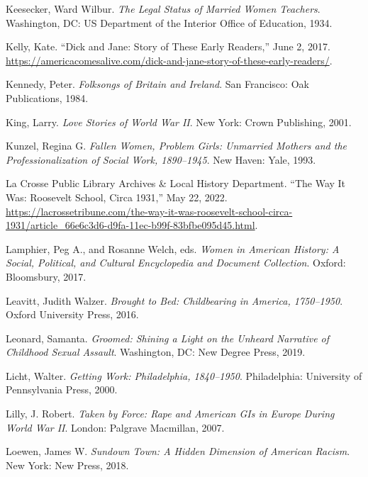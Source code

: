\documentclass[
  letterpaper,
]{book}
\newlength{\cslhangindent}
\newenvironment{CSLReferences}[2] %
 {\begin{list}{}{%
  \setlength{\itemindent}{0pt}
  \setlength{\leftmargin}{0pt}
  \setlength{\parsep}{0pt}
  \ifodd #1
   \setlength{\leftmargin}{\cslhangindent}
   \setlength{\itemindent}{-1\cslhangindent}
  \fi
  \setlength{\itemsep}{#2\baselineskip}}}
 {\end{list}}
\begin{document}
\begin{CSLReferences}{1}{0}
Keesecker, Ward Wilbur. \emph{The Legal Status of Married Women
Teachers}. Washington, DC: US Department of the Interior Office of
Education, 1934.

Kelly, Kate. {``Dick and Jane: Story of These Early Readers,''} June 2,
2017.
\url{https://americacomesalive.com/dick-and-jane-story-of-these-early-readers/}.

Kennedy, Peter. \emph{Folksongs of Britain and Ireland}. San Francisco:
Oak Publications, 1984.

King, Larry. \emph{Love Stories of World War II}. New York: Crown
Publishing, 2001.

Kunzel, Regina G. \emph{Fallen Women, Problem Girls: Unmarried Mothers
and the Professionalization of Social Work, 1890--1945}. New Haven:
Yale, 1993.

La Crosse Public Library Archives \& Local History Department. {``The
Way It Was: Roosevelt School, Circa 1931,''} May 22, 2022.
\url{https://lacrossetribune.com/the-way-it-was-roosevelt-school-circa-1931/article_66e6c3d6-d9fa-11ec-b99f-83bfbe095d45.html}.

Lamphier, Peg A., and Rosanne Welch, eds. \emph{Women in American
History: A Social, Political, and Cultural Encyclopedia and Document
Collection}. Oxford: Bloomsbury, 2017.

Leavitt, Judith Walzer. \emph{Brought to Bed: Childbearing in America,
1750--1950}. Oxford University Press, 2016.

Leonard, Samanta. \emph{Groomed: Shining a Light on the Unheard
Narrative of Childhood Sexual Assault}. Washington, DC: New Degree
Press, 2019.

Licht, Walter. \emph{Getting Work: Philadelphia, 1840--1950}.
Philadelphia: University of Pennsylvania Press, 2000.

Lilly, J. Robert. \emph{Taken by Force: Rape and American GIs in Europe
During World War II}. London: Palgrave Macmillan, 2007.

Loewen, James W. \emph{Sundown Town: A Hidden Dimension of American
Racism}. New York: New Press, 2018.


\end{CSLReferences}
\end{document}
